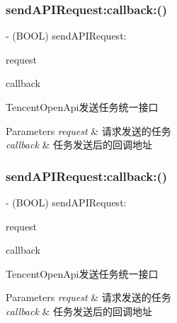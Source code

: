 \subsubsection{\texorpdfstring{send\+A\+P\+I\+Request\+:callback\+:()}{sendAPIRequest:callback:()}\hspace{0.1cm}{\footnotesize\ttfamily [1/2]}}
{\footnotesize\ttfamily -\/ (B\+O\+OL) send\+A\+P\+I\+Request\+: \begin{DoxyParamCaption}\item[{(\mbox{\hyperlink{interface_t_c_a_p_i_request}{T\+C\+A\+P\+I\+Request}} $\ast$)}]{request }\item[{callback:(id$<$ T\+C\+A\+P\+I\+Request\+Delegate $>$)}]{callback }\end{DoxyParamCaption}}

Tencent\+Open\+Api发送任务统一接口 
\begin{DoxyParams}{Parameters}
{\em request} & 请求发送的任务 \\
\hline
{\em callback} & 任务发送后的回调地址 \\
\hline
\end{DoxyParams}
\mbox{\label{interface_tencent_o_auth_a0d2819557e5b7be2de54f21419718763}} 
\subsubsection{\texorpdfstring{send\+A\+P\+I\+Request\+:callback\+:()}{sendAPIRequest:callback:()}\hspace{0.1cm}{\footnotesize\ttfamily [2/2]}}
{\footnotesize\ttfamily -\/ (B\+O\+OL) send\+A\+P\+I\+Request\+: \begin{DoxyParamCaption}\item[{(\mbox{\hyperlink{interface_t_c_a_p_i_request}{T\+C\+A\+P\+I\+Request}} $\ast$)}]{request }\item[{callback:(id$<$ T\+C\+A\+P\+I\+Request\+Delegate $>$)}]{callback }\end{DoxyParamCaption}}

Tencent\+Open\+Api发送任务统一接口 
\begin{DoxyParams}{Parameters}
{\em request} & 请求发送的任务 \\
\hline
{\em callback} & 任务发送后的回调地址 \\
\hline
\end{DoxyParams}
\mbox{\label{interface_tencent_o_auth_aadda5cfd847a7fc39a573590f65d9184}} 

